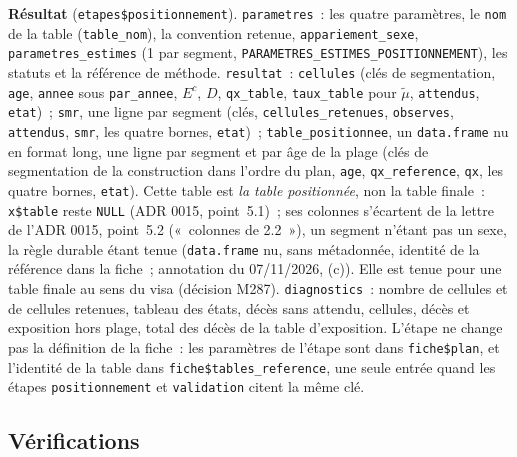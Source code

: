 \documentclass[a4paper,11pt]{article}
\newcommand{\code}[1]{\texttt{\small #1}}
\begin{document}
\medskip
\textbf{Résultat} (\code{etapes\$positionnement}). \code{parametres}~: les
quatre paramètres, le \code{nom} de la table (\code{table\_nom}), la
convention retenue, \code{appariement\_sexe}, \code{parametres\_estimes}
(1 par segment, \code{PARAMETRES\_ESTIMES\_POSITIONNEMENT}), les statuts et
la référence de méthode. \code{resultat}~: \code{cellules} (clés de
segmentation, \code{age}, \code{annee} sous \code{par\_annee}, $E^c$, $D$,
\code{qx\_table}, \code{taux\_table} pour $\tilde\mu$, \code{attendus},
\code{etat})~; \code{smr}, une ligne par segment (clés,
\code{cellules\_retenues}, \code{observes}, \code{attendus}, \code{smr},
les quatre bornes, \code{etat})~; \code{table\_positionnee}, un
\code{data.frame} nu en format long, une ligne par segment et par âge de
la plage (clés de segmentation de la construction dans l'ordre du plan,
\code{age}, \code{qx\_reference}, \code{qx}, les quatre bornes,
\code{etat}). Cette table est \emph{la table positionnée}, non la table
finale~: \code{x\$table} reste \code{NULL} (ADR 0015, point~5.1)~; ses
colonnes s'écartent de la lettre de l'ADR 0015, point~5.2 («~colonnes de
2.2~»), un segment n'étant pas un sexe, la règle durable étant tenue
(\code{data.frame} nu, sans métadonnée, identité de la référence dans la
fiche~; annotation du 07/11/2026, (c)). Elle est tenue pour une table
finale au sens du visa (décision M287). \code{diagnostics}~: nombre de
cellules et de cellules retenues, tableau des états, décès sans attendu,
cellules, décès et exposition hors plage, total des décès de la table
d'exposition. L'étape ne change pas la définition de la fiche~: les
paramètres de l'étape sont dans \code{fiche\$plan}, et l'identité de la
table dans \code{fiche\$tables\_reference}, une seule entrée quand les
étapes \code{positionnement} et \code{validation} citent la même clé.

\subsection{Vérifications}
\label{sec:positionnement-verifications}
\end{document}
